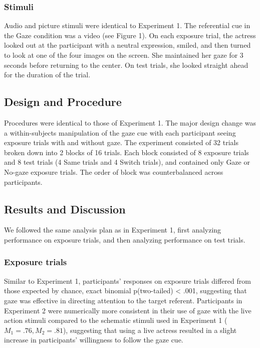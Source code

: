 \documentclass[a4paper,man,floatsintext]{apa6}
\begin{document}
\subsubsection{Stimuli}\label{stimuli-1}

Audio and picture stimuli were identical to Experiment 1. The
referential cue in the Gaze condition was a video (see Figure 1). On
each exposure trial, the actress looked out at the participant with a
neutral expression, smiled, and then turned to look at one of the four
images on the screen. She maintained her gaze for 3 seconds before
returning to the center. On test trials, she looked straight ahead for
the duration of the trial.

\subsection{Design and Procedure}\label{design-and-procedure-1}

Procedures were identical to those of Experiment 1. The major design
change was a within-subjects manipulation of the gaze cue with each
participant seeing exposure trials with and without gaze. The experiment
consisted of 32 trials broken down into 2 blocks of 16 trials. Each
block consisted of 8 exposure trials and 8 test trials (4 Same trials
and 4 Switch trials), and contained only Gaze or No-gaze exposure
trials. The order of block was counterbalanced across participants.

\subsection{Results and Discussion}\label{results-and-discussion-1}

We followed the same analysis plan as in Experiment 1, first analyzing
performance on exposure trials, and then analyzing performance on test
trials.

\subsubsection{Exposure trials}\label{exposure-trials-1}

Similar to Experiment 1, participants' responses on exposure trials
differed from those expected by chance, exact binomial p(two-tailed)
\textless{} .001, suggesting that gaze was effective in directing
attention to the target referent. Participants in Experiment 2 were
numerically more consistent in their use of gaze with the live action
stimuli compared to the schematic stimuli used in Experiment 1
(\(M_1 = .76, M_2 = .81\)), suggesting that using a live actress
resulted in a slight increase in participants' willingness to follow the
gaze cue.
\end{document}
